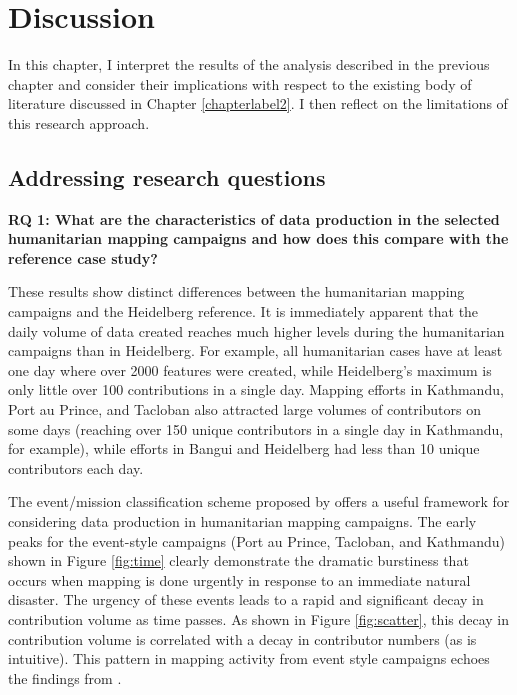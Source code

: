 \chapter{Discussion}
\label{chapterlabel6}

In this chapter, I interpret the results of the analysis described in the previous chapter and consider their implications with respect to the existing body of literature discussed in Chapter \ref{chapterlabel2}. I then reflect on the limitations of this research approach. 
\section{Addressing research questions}

\noindent\textbf{RQ 1: What are the characteristics of data production in the selected humanitarian mapping campaigns and how does this compare with the reference case study?} 

These results show distinct differences between the humanitarian mapping campaigns and the Heidelberg reference. It is immediately apparent that the daily volume of data created reaches much higher levels during the humanitarian campaigns than in Heidelberg. For example, all humanitarian cases have at least one day where over 2000 features were created, while Heidelberg's maximum is only little over 100 contributions in a single day. Mapping efforts in Kathmandu, Port au Prince, and Tacloban also attracted large volumes of contributors on some days (reaching over 150 unique contributors in a single day in Kathmandu, for example), while efforts in Bangui and Heidelberg had less than 10 unique contributors each day. 

The event/mission classification scheme proposed by \textcite{dittus_mass_2017} offers a useful framework for considering data production in humanitarian mapping campaigns. The early peaks for the event-style campaigns (Port au Prince, Tacloban, and Kathmandu) shown in Figure \ref{fig:time} clearly demonstrate the dramatic burstiness that occurs when mapping is done urgently in response to an immediate natural disaster. The urgency of these events leads to a rapid and significant decay in contribution volume as time passes. As shown in Figure \ref{fig:scatter}, this decay in contribution volume is correlated with a decay in contributor numbers (as is intuitive). This pattern in mapping activity from event style campaigns echoes the findings from \textcite[p. 1294]{dittus_mass_2017}.

